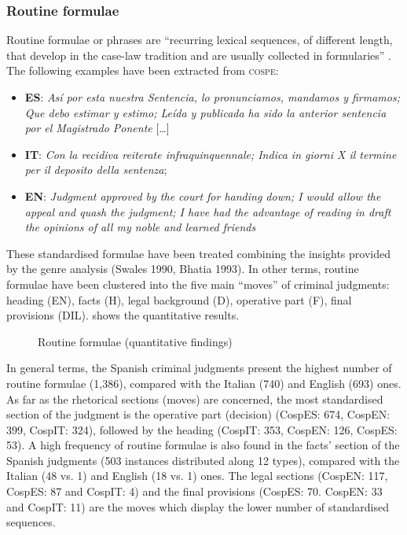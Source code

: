 \documentclass[output=paper]{LSP/langsci}
\begin{document}
\subsubsection{Routine formulae}
Routine formulae or phrases are “recurring lexical sequences, of different length, that develop in the case-law tradition and are usually collected in formularies” \citep[28-29]{Kjær1990}. The following examples have been extracted from \textsc{cospe}:

\begin{itemize}
\item \textbf{ES}: \textit{Así por esta nuestra Sentencia, lo pronunciamos, mandamos y firmamos; Que debo estimar y estimo; Leída y publicada ha sido la anterior sentencia por el Magistrado Ponente} […]
\item \textbf{IT}: \textit{Con la recidiva reiterate infraquinquennale; Indica in giorni X il termine per il deposito della sentenza};
\item \textbf{EN}: \textit{Judgment approved by the court for handing down; I would allow the appeal and quash the judgment; I have had the advantage of reading in draft the opinions of all my noble and learned friends}
\end{itemize}

These standardised formulae have been treated combining the insights provided by the genre analysis (Swales 1990, Bhatia 1993). In other terms, routine formulae have been clustered into the five main “moves” of criminal judgments: heading (EN), facts (H), legal background (D), operative part (F), final provisions (DIL).  shows the quantitative results.

\begin{figure}

\caption{Routine formulae (quantitative findings)} \label{fig:6:4}
\end{figure}

In general terms, the Spanish criminal judgments present the highest number of routine formulae (1,386), compared with the Italian (740) and English (693) ones. As far as the rhetorical sections (moves) are concerned, the most standardised section of the judgment is the operative part (decision) (CospES: 674, CospEN: 399, CospIT: 324), followed by the heading (CospIT: 353, CospEN: 126, CospES: 53). A high frequency of routine formulae is also found in the facts’ section of the Spanish judgments (503 instances distributed along 12 types), compared with the Italian (48 vs. 1) and English (18 vs. 1) ones. The legal sections (CospEN: 117, CospES: 87 and CospIT: 4) and the final provisions (CospES: 70. CospEN: 33 and CospIT: 11) are the moves which display the lower number of standardised sequences.
\end{document}

